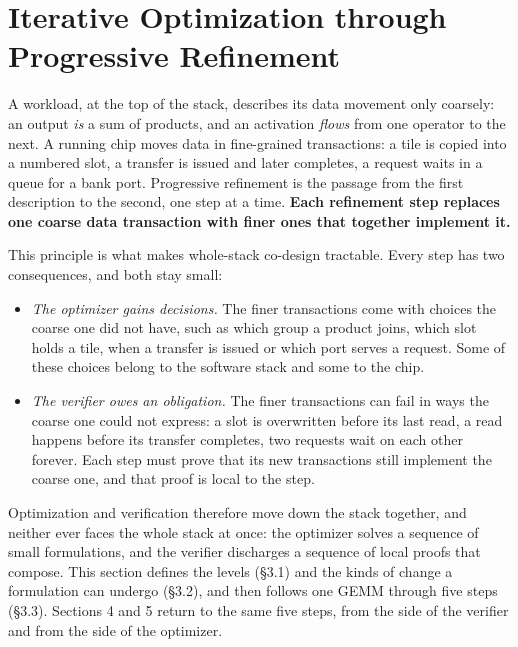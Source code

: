 \documentclass[11pt]{article}
\providecommand{\tightlist}{\setlength{\itemsep}{0pt}\setlength{\parskip}{0pt}}
\begin{document}
\hypertarget{iterative-optimization-through-progressive-refinement}{%
\section{Iterative Optimization through Progressive Refinement}\label{iterative-optimization-through-progressive-refinement}}

A workload, at the top of the stack, describes its data movement only coarsely: an output \emph{is} a sum of products, and an activation \emph{flows} from one operator to the next. A running chip moves data in fine-grained transactions: a tile is copied into a numbered slot, a transfer is issued and later completes, a request waits in a queue for a bank port. Progressive refinement is the passage from the first description to the second, one step at a time. \textbf{Each refinement step replaces one coarse data transaction with finer ones that together implement it.}

This principle is what makes whole-stack co-design tractable. Every step has two consequences, and both stay small:

\begin{itemize}
\tightlist
\item
  \emph{The optimizer gains decisions.} The finer transactions come with choices the coarse one did not have, such as which group a product joins, which slot holds a tile, when a transfer is issued or which port serves a request. Some of these choices belong to the software stack and some to the chip.
\item
  \emph{The verifier owes an obligation.} The finer transactions can fail in ways the coarse one could not express: a slot is overwritten before its last read, a read happens before its transfer completes, two requests wait on each other forever. Each step must prove that its new transactions still implement the coarse one, and that proof is local to the step.
\end{itemize}

Optimization and verification therefore move down the stack together, and neither ever faces the whole stack at once: the optimizer solves a sequence of small formulations, and the verifier discharges a sequence of local proofs that compose. This section defines the levels (§3.1) and the kinds of change a formulation can undergo (§3.2), and then follows one GEMM through five steps (§3.3). Sections 4 and 5 return to the same five steps, from the side of the verifier and from the side of the optimizer.
\end{document}
